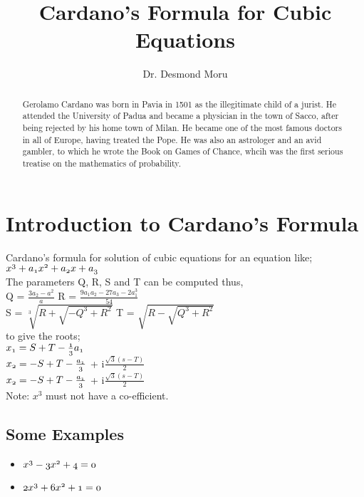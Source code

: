 \documentclass{article}
\begin{document}
	\title{Cardano's Formula for Cubic Equations}
	\author{Dr. Desmond Moru}
	\maketitle
	
	\begin{abstract}
		Gerolamo Cardano was born in Pavia in 1501 as the illegitimate child of a jurist. He attended the University of Padua and became a physician in the town of Sacco, after being rejected by his home town of Milan. He became one of the most famous doctors in all of Europe, having treated the Pope. He was also an astrologer and an avid gambler, to which he wrote the Book on Games of Chance, whcih was the first serious treatise on the mathematics of probability.\cite{cbib}
		\end{abstract}


\section{Introduction to Cardano's Formula}
Cardano's formula for solution of cubic equations for an equation like; \\
	$\mathnormal{x^{3} + a_{1}x^{2} +a_{2}x +a_{3}}$ \\
	The parameters Q, R, S and T can be computed  thus, \\

	Q = $\frac{3a_{2}-a^{2}}{a}$  R = $\frac{9a_{1}a_{2}-27a_{3}-2a^{3}_{1}}{54}$ 
	\\
	
	S = $\sqrt[3]{R + \sqrt{-Q^{3} + R^{2}}}$  T = $\sqrt{R - \sqrt{Q^{3} + R^{2}}} $ 
	\\

	to give the roots; 
	\\

	$\mathnormal{x_{1} = S + T - \frac{1}{3}a_{1}}$ 
	\\
	$\mathnormal{x_{2} = -S + T - \frac{a_{1}}{3}}$ + i$\frac{\sqrt{3}(s-T)}{2}$ 
	\\
	$\mathnormal{x_{2} = -S + T - \frac{a_{1}}{3}}$ + i$\frac{\sqrt{3}(s-T)}{2}$ 
	\\
	
	Note: $x^{3}$ must not have a co-efficient.
	
	\subsection{Some Examples}
	\begin{itemize}
		\item $\mathnormal{x^{3} - 3x^{2} + 4 = 0}$
		
		\item $\mathnormal{2x^{3} + 6x^{2} + 1 = 0}$
	\end{itemize}
	
	
\end{document}
